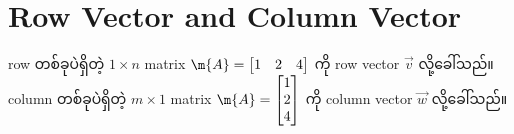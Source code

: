 \section{Row Vector and Column Vector}
row တစ်ခုပဲရှိတဲ့ $1 \times n$ matrix $\m{A}=\begin{bmatrix}
    1 & 2 & 4
\end{bmatrix}$ ကို row vector $\vec{v}$ လို့ခေါ်သည်။
column တစ်ခုပဲရှိတဲ့ $m \times 1$ matrix $\m{A}=\begin{bmatrix}
    1 \\ 2 \\ 4
\end{bmatrix}$ ကို column vector $\vec{w}$ လို့ခေါ်သည်။
